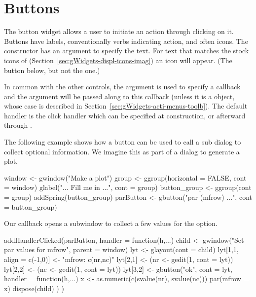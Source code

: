 
\section{Buttons}
\label{sec:gWidgets-buttons}

The button widget allows a user to initiate an action through clicking
on it. Buttons have labels, conventionally verbs indicating action,
and often icons. The  constructor has an argument
 to specify the text.  For text that matches
the stock icons of 
(Section~\ref{sec:gWidgets-displ-icons-imag}) an icon will
appear. (The  button below, but not the  one.)

In common with the other controls, the argument
 is used to specify a callback and the
 argument will be passed along to this
callback (unless it is a  object, whose case is
described in Section~\ref{sec:gWidgets-acti-menus-toolb}).  The
default handler is the click handler which can be specified at
construction, or afterward through
. 

The following example shows how a button can be used to call a sub
dialog to collect optional information. We imagine this as part of a
dialog to generate a plot.

\begin{Schunk}
\begin{Sinput}
 window <- gwindow("Make a plot")
 group <- ggroup(horizontal = FALSE, cont = window)
 glabel("... Fill me in ...", cont = group)
 button_group <- ggroup(cont = group)
 addSpring(button_group)
 parButton <- gbutton("par (mfrow) ...", cont = button_group)
\end{Sinput}
\end{Schunk}
Our callback opens a subwindow to collect a few values for the
 option.
\begin{Schunk}
\begin{Sinput}
 addHandlerClicked(parButton, handler = function(h,...) {
   child <- gwindow("Set par values for mfrow", parent = window)
   lyt <- glayout(cont = child)
   lyt[1,1, align = c(-1,0)] <- "mfrow: c(nr,nc)"
   lyt[2,1] <- (nr <- gedit(1, cont = lyt))
   lyt[2,2] <- (nc <- gedit(1, cont = lyt))
   lyt[3,2] <- 
     gbutton("ok", cont = lyt, handler = 
             function(h,...) {
               x <- as.numeric(c(svalue(nr), svalue(nc)))
               par(mfrow = x)
               dispose(child)
             })
 })
\end{Sinput}
\end{Schunk}



